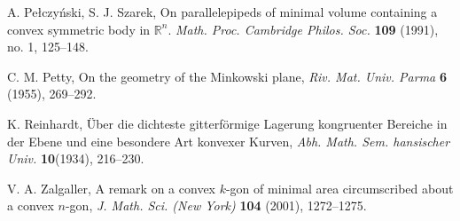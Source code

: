 \documentclass [10pt,oneside]{amsart}
\theoremstyle{definition}
\theoremstyle{plain}
\begin{document}
\begin{thebibliography}{99}
 A. Pe{\l}czy\'{n}ski, S. J. Szarek, On parallelepipeds of minimal volume containing a convex symmetric body in $\mathbb{R}^n$. \emph{ Math. Proc. Cambridge Philos. Soc.} {\bf 109} (1991), no. 1, 125--148.

 C. M. Petty, On the geometry of the Minkowski plane, \emph{Riv. Mat. Univ. Parma} {\bf 6} (1955), 269--292.

 K. Reinhardt, \"{U}ber die dichteste gitterf\"{o}rmige Lagerung kongruenter Bereiche in der Ebene und
eine besondere Art konvexer Kurven, \emph{Abh. Math. Sem. hansischer Univ.} {\bf 10}(1934), 216--230.

 V. A. Zalgaller, A remark on a convex $k$-gon of minimal area circumscribed about a convex $n$-gon,
\emph{J. Math. Sci. (New York)} {\bf 104} (2001), 1272--1275.



\end{thebibliography}
\end{document}
